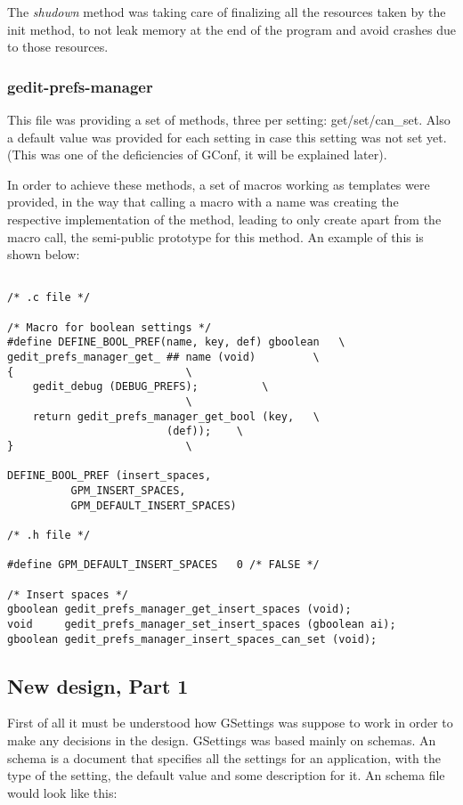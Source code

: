 The \emph{shudown} method was taking care of finalizing all the resources taken by the init method, to not leak memory at the end of the program and avoid crashes due to those resources.

\subsubsection*{gedit-prefs-manager}

This file was providing a set of methods, three per setting: get/set/can\_set. Also a default value was provided for each setting in case this setting was not set yet. (This was one of the deficiencies of GConf, it will be explained later).

In order to achieve these methods, a set of macros working as templates were provided, in the way that calling a macro with a name was creating the respective implementation of the method, leading to only create apart from the macro call, the semi-public prototype for this method. An example of this is shown below:

\begin{lstlisting}[style=GObject]

/* .c file */

/* Macro for boolean settings */
#define DEFINE_BOOL_PREF(name, key, def) gboolean 	\
gedit_prefs_manager_get_ ## name (void)			\
{							\
	gedit_debug (DEBUG_PREFS);			\
							\
	return gedit_prefs_manager_get_bool (key,	\
					     (def));	\
}							\

DEFINE_BOOL_PREF (insert_spaces,
		  GPM_INSERT_SPACES,
		  GPM_DEFAULT_INSERT_SPACES)

/* .h file */

#define GPM_DEFAULT_INSERT_SPACES	0 /* FALSE */

/* Insert spaces */
gboolean gedit_prefs_manager_get_insert_spaces (void);
void	 gedit_prefs_manager_set_insert_spaces (gboolean ai);
gboolean gedit_prefs_manager_insert_spaces_can_set (void);

\end{lstlisting}

\subsection{New design, Part 1}

First of all it must be understood how GSettings was suppose to work in order to make any decisions in the design. GSettings was based mainly on schemas. An schema is a document that specifies all the settings for an application, with the type of the setting, the default value and some description for it. An schema file would look like this:

